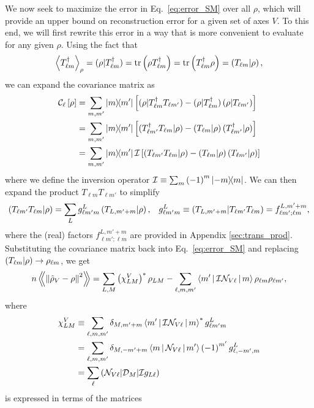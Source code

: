 \documentclass[notitlepage,twocolumn]{revtex4-2}
\newcommand{\p}[1]{\left(#1\right)} %
\renewcommand{\sp}[1]{\left[#1\right]} %
\newcommand{\bk}{\Braket} %
\newcommand{\Bbk}[1]
{\left\langle\!\!\left\langle #1 \right\rangle\!\!\right\rangle}
\newcommand{\C}{\mathcal{C}}
\newcommand{\D}{\mathcal{D}}
\newcommand{\I}{\mathcal{I}}
\newcommand{\N}{\mathcal{N}}
\def\obk#1{\mathinner{({#1})}}
\newcommand{\1}{\mathds{1}}
\begin{document}
We now seek to maximize the error in Eq.~\eqref{eq:error_SM} over all $\rho$, which will provide an upper bound on reconstruction error for a given set of axes $V$.
To this end, we will first rewrite this error in a way that is more convenient to evaluate for any given $\rho$.
Using the fact that
\begin{align}
  \bk{T_{\ell m}^\dag}_\rho
  = \obk{\rho|T_{\ell m}^\dag}
  = \tr\p{\rho T_{\ell m}^\dag}
  = \tr\p{T_{\ell m}^\dag \rho}
  = \obk{T_{\ell m}|\rho},
\end{align}
we can expand the covariance matrix as
\begin{align}
  \C_\ell\sp{\rho}
  &= \sum_{m,m'} \op{m}{m'} \sp{\obk{\rho|T_{\ell m}^\dag T_{\ell m'}}
    - \obk{\rho|T_{\ell m}^\dag} \obk{\rho|T_{\ell m'}}} \\
  &= \sum_{m,m'} \op{m}{m'} \sp{\obk{T_{\ell m'}^\dag T_{\ell m}|\rho}
    - \obk{T_{\ell m}|\rho} \obk{T_{\ell m'}^\dag|\rho}} \\
  &= \sum_{m,m'} \op{m}{m'}\I \sp{\obk{T_{\ell m'} T_{\ell m}|\rho}
    - \obk{T_{\ell m}|\rho} \obk{T_{\ell m'}|\rho}}
\end{align}
where we define the inversion operator $\I\equiv\sum_m \p{-1}^m\op{-m}{m}$.
We can then expand the product $T_{\ell m} T_{\ell m'}$ to simplify
\begin{align}
  \obk{T_{\ell m'} T_{\ell m}|\rho}
  = \sum_L g_{\ell m'm}^L \obk{T_{L,m'+m}|\rho},
  &&
  g_{\ell m'm}^L \equiv \obk{T_{L,m'+m} | T_{\ell m'} T_{\ell m}}
  = f_{\ell m';\ell m}^{L,m'+m},
\end{align}
where the (real) factors $f_{\ell m';\ell m}^{L,m'+m}$ are provided in Appendix \ref{sec:trans_prod}.
Substituting the covariance matrix back into Eq.~\eqref{eq:error_SM} and replacing $\obk{T_{\ell m}|\rho}\to\rho_{\ell m}$, we get
\begin{align}
  n \Bbk{\norm{\tilde\rho_V-\rho}^2}
  = \sum_{L,M} \p{\chi^V_{LM}}^* \rho_{LM}
  - \sum_{\ell,m,m'} \bk{m'|\I\N_{V\ell}|m}
  \rho_{\ell m} \rho_{\ell m'},
  \label{eq:error_comps}
\end{align}
where
\begin{align}
  \chi^V_{LM}
  &\equiv \sum_{\ell,m,m'} \delta_{M,m'+m}
  \bk{m'|\I\N_{V\ell}|m}^* g^L_{\ell m'm} \\
  &= \sum_{\ell,m,m'} \delta_{M,-m'+m}
  \bk{m|\N_{V\ell}|m'} \p{-1}^{m'} g^L_{\ell,-m',m} \\
  &= \sum_\ell \obk{\N_{V\ell}|\D_M|\I g_{L\ell}}
\end{align}
is expressed in terms of the matrices
\end{document}
